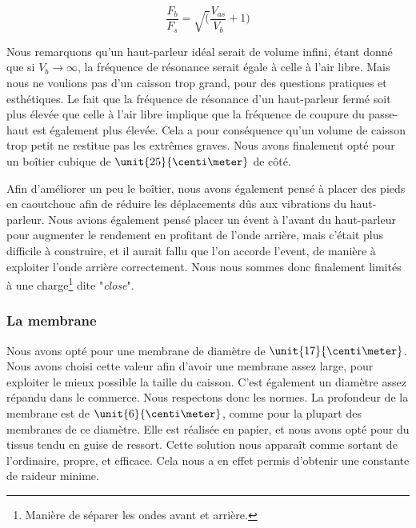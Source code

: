 $$\frac{F_b}{F_s} = \sqrt(\frac{V_{as}}{V_b} +1)$$

Nous remarquons qu'un haut-parleur idéal serait de volume infini, étant donné que si $V_b\rightarrow \infty$, la fréquence de résonance serait égale à celle à l'air libre. Mais nous ne voulions pas d'un caisson trop grand, pour des questions pratiques et esthétiques.
Le fait que la fréquence de résonance d'un haut-parleur fermé soit plus élevée que celle à l'air libre implique que
la fréquence de coupure du passe-haut est également plus élevée. Cela a pour conséquence
qu'un volume de caisson trop petit ne restitue pas les extrêmes graves. Nous avons finalement opté pour un boîtier
cubique de $\unit{25}{\centi\meter}$ de côté.

Afin d'améliorer un peu le boîtier, nous avons également pensé à placer des pieds en caoutchouc afin de
réduire les déplacements dûs aux vibrations du haut-parleur. Nous avions également pensé placer un évent à l'avant du haut-parleur
pour augmenter le rendement en profitant de l'onde arrière, mais c'était plus difficile à construire, et
il aurait fallu que l'on accorde l'event, de manière à exploiter l'onde arrière correctement. Nous nous
sommes donc finalement limités à une charge\footnote{Manière de séparer les ondes avant et arrière.} dite
"\textit{close}"\cite{close}.


\subsubsection{La membrane}
Nous avons opté pour une membrane de diamètre de $\unit{17}{\centi\meter}$. Nous avons choisi cette valeur afin
d'avoir une membrane assez large, pour exploiter le mieux possible la taille du caisson. C'est également un
diamètre assez répandu dans le commerce\cite{tlhp}. Nous respectons donc les normes.
La profondeur de la membrane est de $\unit{6}{\centi\meter}$, comme pour la plupart des membranes de ce
diamètre\cite{tlhp}. Elle est réalisée en papier, et nous avons opté pour du tissus tendu en guise de ressort.
Cette solution nous apparaît comme sortant de l'ordinaire, propre, et efficace. Cela nous a en effet permis
d'obtenir une constante de raideur minime.

